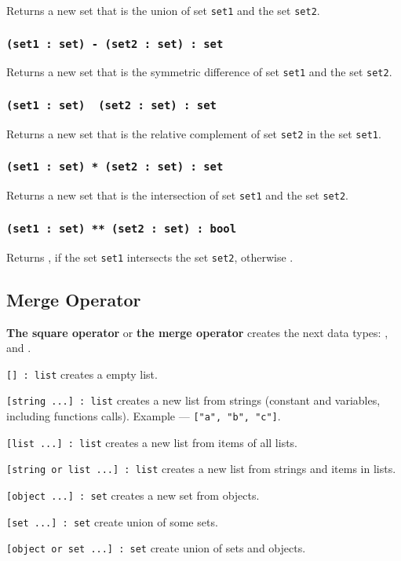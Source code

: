 Returns a new set that is the union of set \texttt{set1} and the set \texttt{set2}.

\subsubsection{\texttt{(set1 : set) - (set2 : set) : set}}

Returns a new set that is the symmetric difference of set \texttt{set1} and the set \texttt{set2}.

\subsubsection{\texttt{(set1 : set) \ (set2 : set) : set}}

Returns a new set that is the relative complement of set \texttt{set2} in the set \texttt{set1}.

\subsubsection{\texttt{(set1 : set) * (set2 : set) : set}}

Returns a new set that is the intersection of set \texttt{set1} and the set \texttt{set2}.

\subsubsection{\texttt{(set1 : set) ** (set2 : set) : bool}}

Returns \true, if the set \texttt{set1} intersects the set \texttt{set2}, otherwise \false.

\subsection{Merge Operator}

{\bf The square operator} or {\bf the merge operator} creates the next data types: \listtype{}, \set{} and \object{}.

\texttt{[] : list} creates a empty list.

\texttt{[string ...] : list} creates a new list from strings (constant and variables, including functions calls). Example —  \texttt{["a", "b", "c"]}.

\texttt{[list ...] : list} creates a new list from items of all lists.

\texttt{[string or list ...] : list} creates a new list from strings and items in lists.

\texttt{[object ...] : set} creates a new set from objects.

\texttt{[set ...] : set} create union of some sets.

\texttt{[object or set ...] : set} create union of sets and objects.

